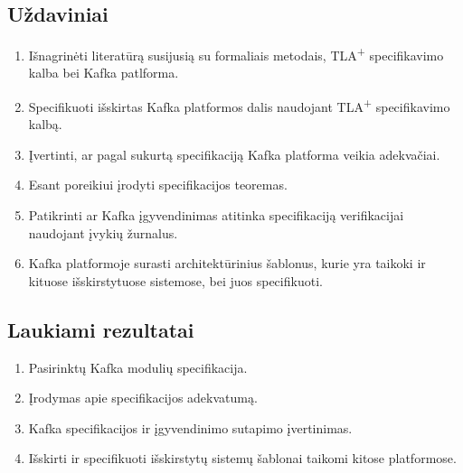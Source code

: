 \documentclass{VUMIFPSmagistrinis}
\begin{document}
	\subsection{Uždaviniai}
		\begin{enumerate}
			\item{Išnagrinėti literatūrą susijusią su formaliais metodais, TLA\textsuperscript{+} specifikavimo kalba bei Kafka patlforma.}
			\item{Specifikuoti išskirtas Kafka platformos dalis naudojant TLA\textsuperscript{+} specifikavimo kalbą.}
			\item{Įvertinti, ar pagal sukurtą specifikaciją Kafka platforma veikia adekvačiai.}
			\item{Esant poreikiui įrodyti specifikacijos teoremas.}
			\item{Patikrinti ar Kafka įgyvendinimas atitinka specifikaciją verifikacijai naudojant įvykių žurnalus.}
			\item{Kafka platformoje surasti architektūrinius šablonus, kurie yra taikoki ir kituose išskirstytuose sistemose, bei juos specifikuoti.}
		\end{enumerate}
	
	\subsection{Laukiami rezultatai}
		\begin{enumerate}
			\item{Pasirinktų Kafka modulių specifikacija.}
			\item{Įrodymas apie specifikacijos adekvatumą.}
			\item{Kafka
 specifikacijos ir įgyvendinimo sutapimo įvertinimas.}
			\item{Išskirti ir specifikuoti išskirstytų sistemų šablonai taikomi kitose platformose.}
		\end{enumerate}
	
	\printbibliography[heading=bibintoc] 
\end{document}
